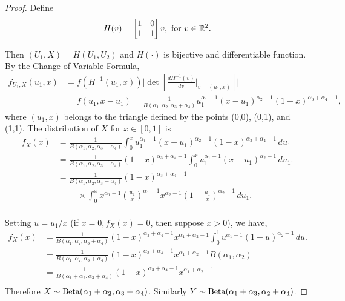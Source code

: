 \begin{proof}
Define 
$$
H(v) = \begin{bmatrix}
  1 & 0 \\ 1 & 1
\end{bmatrix}v, \text{ for } v \in \mathbb{R}^2.
$$

Then $(U_1, X) = H(U_1, U_2)$ and $H(\cdot)$ is bijective and differentiable function. By the Change of Variable Formula, 
\begin{equation}
  \begin{split}
    f_{U_1, X}(u_1, x) &= f({H^{-1}(u_1,x)})\bigg|\det\left[\frac{dH^{-1}(v)}{dv}\bigg|_{v=(u_1,x)}\right]\bigg| \\ 
    &= f(u_1, x - u_1) = \frac{1}{B(\alpha_1, \alpha_2, \alpha_3+\alpha_4)}u_1^{\alpha_1-1}(x-u_1)^{\alpha_2-1}(1-x)^{\alpha_3+\alpha_4-1}, 
  \end{split}
\end{equation}
where $(u_1, x)$ belongs to the triangle defined by the points (0,0),
(0,1), and (1,1). The distribution of $X$ for $x \in [0,1]$ is
\begin{equation}
  \begin{split}
    f_X(x) &= \frac{1}{B(\alpha_1, \alpha_2, \alpha_3+\alpha_4)}\int_{0}^{x} u_1^{\alpha_1-1}(x-u_1)^{\alpha_2-1}(1-x)^{\alpha_3+\alpha_4-1} \, du_1 \\
    &= \frac{1}{B(\alpha_1, \alpha_2, \alpha_3+\alpha_4)}(1-x)^{\alpha_3+\alpha_4-1} \int_{0}^{x} u_1^{\alpha_1-1}(x-u_1)^{\alpha_2-1} \, du_1. \\
    &= \frac{1}{B(\alpha_1, \alpha_2, \alpha_3+\alpha_4)}(1-x)^{\alpha_3+\alpha_4-1} \\
    &\hspace{1cm}\times \int_{0}^{x} x^{\alpha_1-1} \left(\frac{u_1}{x}\right)^{\alpha_1-1}x^{\alpha_2 - 1}\left(1-\frac{u_1}{x}\right)^{\alpha_2-1} \, du_1. \\
  \end{split}
\end{equation}

Setting $u = u_1/x$ (if $x = 0, f_X(x) = 0$, then suppose $x > 0$), we have, 
\begin{equation}
  \begin{split}
    f_X(x) &= \frac{1}{B(\alpha_1, \alpha_2, \alpha_3+\alpha_4)}(1-x)^{\alpha_3+\alpha_4-1} x^{\alpha_1+\alpha_2-1} \int_{0}^{1} u^{\alpha_1-1}(1-u)^{\alpha_2-1} \, du. \\
    &= \frac{1}{B(\alpha_1, \alpha_2, \alpha_3+\alpha_4)}(1-x)^{\alpha_3+\alpha_4-1} x^{\alpha_1+\alpha_2-1} B(\alpha_1, \alpha_2)\\
    &= \frac{1}{B(\alpha_1 + \alpha_2, \alpha_3+\alpha_4)}(1-x)^{\alpha_3+\alpha_4-1} x^{\alpha_1+\alpha_2-1}\\
  \end{split}
\end{equation}
Therefore $X \sim \operatorname{Beta}(\alpha_1+\alpha_2, \alpha_3+\alpha_4)$. Similarly $Y \sim \operatorname{Beta}(\alpha_1+\alpha_3, \alpha_2 + \alpha_4)$.
\end{proof}

